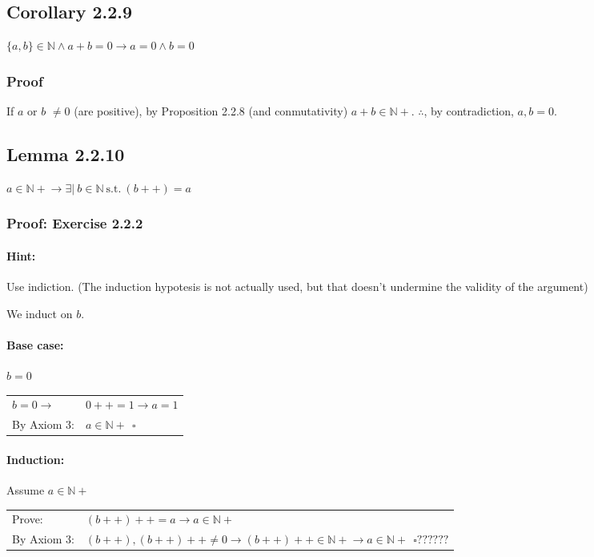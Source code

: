 \documentclass[letterpaper]{article}
\begin{document}
\subsection*{Corollary 2.2.9}
$ \{a,b\} \in \mathbb{N} \land a + b = 0 \to a = 0 \land b = 0$

\subsubsection*{Proof}
If $a$ or $b$ $\neq 0$ (are positive), by Proposition 2.2.8 (and conmutativity) $a + b \in \mathbb{N+}$. $\therefore$, by contradiction, $a,b = 0$. 


\subsection*{Lemma 2.2.10}
$a \in \mathbb{N+} \to \exists |~ b \in \mathbb{N} ~\text{s.t.}~ (b++) = a$

\subsubsection*{Proof: Exercise 2.2.2}
\paragraph{Hint:} Use indiction. (The induction hypotesis is not actually used, but that doesn't undermine the validity of the argument)

\vspace{\parskip}
We induct on $b$.

\paragraph{Base case:} $b = 0$
\begin{center}
  \begin{tabular}{l l}
		$b = 0 \to$        & $0++ = 1 \to a = 1$ \\ 
		By Axiom 3:				 & $a \in \mathbb{N+} ~~\square$
  \end{tabular}
\end{center}

\paragraph{Induction:} Assume $a \in \mathbb{N+}$
\begin{center}
  \begin{tabular}{l l}
		Prove:             & $(b++)++ = a \to a \in \mathbb{N+}$ \\ 
		By Axiom 3:        & $(b++), (b++)++ \neq 0 \to (b++)++ \in \mathbb{N+} \to a \in \mathbb{N+} ~~\square??????$
  \end{tabular}
\end{center}
\end{document}
